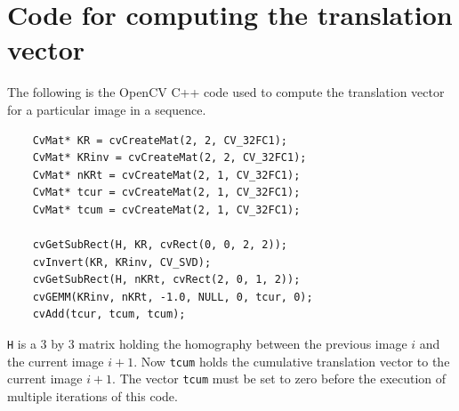 \documentclass{article}
\begin{document}
\section{Code for computing the translation vector}
\label{apdx:t}

The following is the OpenCV C++ code used to compute the translation vector for
a particular image in a sequence. 

\begin{verbatim}
    CvMat* KR = cvCreateMat(2, 2, CV_32FC1);
    CvMat* KRinv = cvCreateMat(2, 2, CV_32FC1);
    CvMat* nKRt = cvCreateMat(2, 1, CV_32FC1);
    CvMat* tcur = cvCreateMat(2, 1, CV_32FC1);
    CvMat* tcum = cvCreateMat(2, 1, CV_32FC1);
    
    cvGetSubRect(H, KR, cvRect(0, 0, 2, 2));
    cvInvert(KR, KRinv, CV_SVD);
    cvGetSubRect(H, nKRt, cvRect(2, 0, 1, 2));
    cvGEMM(KRinv, nKRt, -1.0, NULL, 0, tcur, 0);
    cvAdd(tcur, tcum, tcum);
\end{verbatim}

\verb|H| is a $3$ by $3$ matrix holding the homography between the previous
image $i$ and the current image $i + 1$. Now \verb|tcum| holds the cumulative
translation vector to the current image $i + 1$. The vector \verb|tcum| must be
set to zero before the execution of multiple iterations of this code. 
\end{document}
